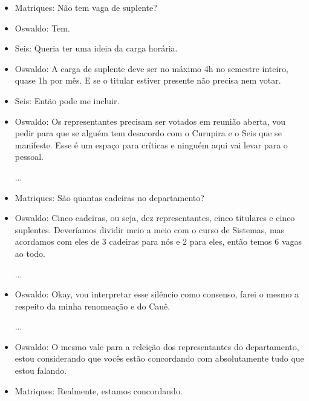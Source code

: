 \documentclass{ata-calico}
\begin{document}
\begin{itemize}
\item Matriques: Não tem vaga de suplente?

\item Oswaldo: Tem.

\item Seis: Queria ter uma ideia da carga horária.

\item Oswaldo: A carga de suplente deve ser no máximo 4h no semestre inteiro, quase 1h por mês. E se o titular estiver presente não precisa nem votar.

\item Seis: Então pode me incluir.


\item Oswaldo: Os representantes precisam ser votados em reunião aberta, vou pedir para que se alguém tem desacordo com o Curupira e o Seis que se manifeste. Esse é um espaço para críticas e ninguém aqui vai levar para o pessoal.

...

\item Matriques: São quantas cadeiras no departamento?

\item Oswaldo: Cinco cadeiras, ou seja, dez representantes, cinco titulares e cinco suplentes. Deveríamos dividir meio a meio com o curso de Sistemas, mas acordamos com eles de 3 cadeiras para nós e 2 para eles, então temos 6 vagas ao todo.

...

\item Oswaldo: Okay, vou interpretar esse silêncio como consenso, farei o mesmo a respeito da minha renomeação e do Cauê.

...

\item Oswaldo: O mesmo vale para a releição dos representantes do departamento, estou considerando que vocês estão concordando com absolutamente tudo que estou falando.

\item Matriques: Realmente, estamos concordando.
\end{itemize}
\end{document}
